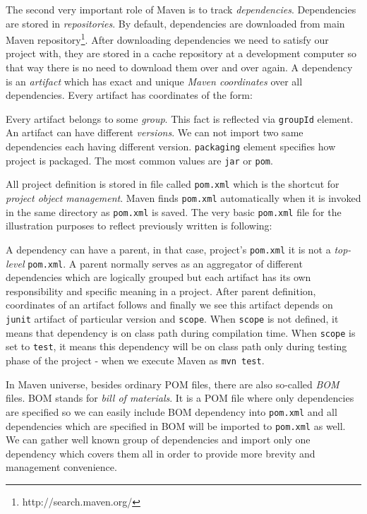\documentclass[12pt,final,oneside]{fithesis}
\begin{document}
The second very important role of Maven is to track \textit{dependencies}. Dependencies are stored in \textit{repositories}. By default, dependencies are downloaded from main Maven repository\footnote{http://search.maven.org/}. After downloading dependencies we need to satisfy our project with, they are stored in a cache repository at a development computer so that way there is no need to download them over and over again. A dependency is an \textit{artifact} which has exact and unique \textit{Maven coordinates} over all dependencies. Every artifact has coordinates of the form:
\begin{center}
	\begin{minipage}{.7\textwidth}
		
	\end{minipage}
\end{center}
Every artifact belongs to some \textit{group}. This fact is reflected via \texttt{groupId} element. An artifact can have different \textit{versions}. We can not import two same dependencies each having different version. \texttt{packaging} element specifies how project is packaged. The most common values are \texttt{jar} or \texttt{pom}.

All project definition is stored in file called \texttt{pom.xml} which is the shortcut for \textit{project object management}. Maven finds \texttt{pom.xml} automatically when it is invoked in the same directory as \texttt{pom.xml} is saved. The very basic \texttt{pom.xml} file for the illustration purposes to reflect previously written is following:



A dependency can have a parent, in that case, project's \texttt{pom.xml} it is not a \textit{top-level} \texttt{pom.xml}. A parent normally serves as an aggregator of different dependencies which are logically grouped but each artifact has its own responsibility and specific meaning in a project. After parent definition, coordinates of an artifact follows and finally we see this artifact depends on \texttt{junit} artifact of particular version and \texttt{scope}. When \texttt{scope} is not defined, it means that dependency is on class path during compilation time. When \texttt{scope} is set to \texttt{test}, it means this dependency will be on class path only during testing phase of the project - when we execute Maven as \texttt{mvn test}.

In Maven universe, besides ordinary POM files, there are also so-called \textit{BOM} files. BOM stands for \textit{bill of materials}. It is a POM file where only dependencies are specified so we can easily include BOM dependency into \texttt{pom.xml} and all dependencies which are specified in BOM will be imported to \texttt{pom.xml} as well. We can gather well known group of dependencies and import only one dependency which covers them all in order to provide more brevity and management convenience.
\end{document}
